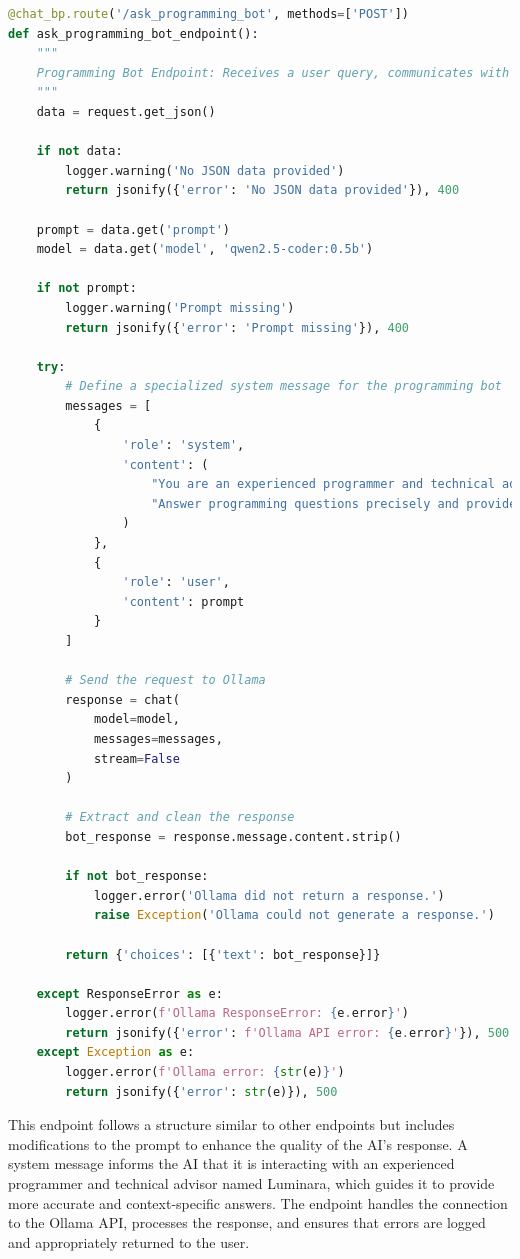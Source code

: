 \begin{lstlisting}[language=Python]
@chat_bp.route('/ask_programming_bot', methods=['POST'])
def ask_programming_bot_endpoint():
    """
    Programming Bot Endpoint: Receives a user query, communicates with Ollama, and returns the response.
    """
    data = request.get_json()

    if not data:
        logger.warning('No JSON data provided')
        return jsonify({'error': 'No JSON data provided'}), 400

    prompt = data.get('prompt')
    model = data.get('model', 'qwen2.5-coder:0.5b')

    if not prompt:
        logger.warning('Prompt missing')
        return jsonify({'error': 'Prompt missing'}), 400

    try:
        # Define a specialized system message for the programming bot
        messages = [
            {
                'role': 'system',
                'content': (
                    "You are an experienced programmer and technical advisor named Luminara. "
                    "Answer programming questions precisely and provide clear code examples in the requested programming language."
                )
            },
            {
                'role': 'user',
                'content': prompt
            }
        ]

        # Send the request to Ollama
        response = chat(
            model=model,
            messages=messages,
            stream=False
        )

        # Extract and clean the response
        bot_response = response.message.content.strip()

        if not bot_response:
            logger.error('Ollama did not return a response.')
            raise Exception('Ollama could not generate a response.')

        return {'choices': [{'text': bot_response}]}

    except ResponseError as e:
        logger.error(f'Ollama ResponseError: {e.error}')
        return jsonify({'error': f'Ollama API error: {e.error}'}), 500
    except Exception as e:
        logger.error(f'Ollama error: {str(e)}')
        return jsonify({'error': str(e)}), 500 
\end{lstlisting}

This endpoint follows a structure similar to other endpoints but includes modifications to the prompt to enhance the quality of the AI's response. A system message informs the AI that it is interacting with an experienced programmer and technical advisor named Luminara, which guides it to provide more accurate and context-specific answers. The endpoint handles the connection to the Ollama API, processes the response, and ensures that errors are logged and appropriately returned to the user.



